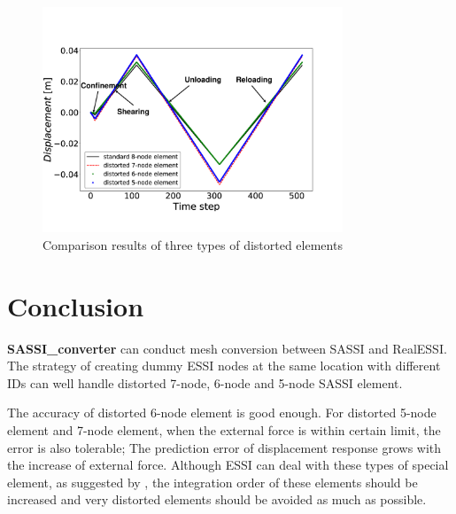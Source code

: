 \documentclass{article}
\begin{document}
\begin{figure}[H]
\begin{center}
\includegraphics[width=0.8\textwidth]{images/comparison_result_annotation.pdf}
\end{center}
\caption{\label{Fig: comparison result of distorted elements} Comparison results of three types of distorted elements}
\end{figure}



\section{Conclusion}

\textbf{SASSI\_converter} can conduct mesh conversion between SASSI and RealESSI. 
%
The strategy of creating dummy ESSI nodes at the same location with different IDs can well handle distorted 7-node, 6-node and 5-node SASSI element. 

%
The accuracy of distorted 6-node element is good enough. 
%
For distorted 5-node element and 7-node element, when the external force is within certain limit, the error is also tolerable; 
%
The prediction error of displacement response grows with the increase of external force. 
%
Although ESSI can deal with these types of special element, as suggested by \citet{SASSIUsrManual}, the integration order of these elements should be increased and very distorted elements should be avoided as much as possible. 


\setlength\bibsep{0.3pt}


\end{document}
